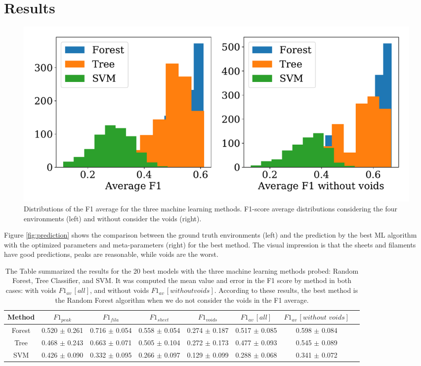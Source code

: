 \documentclass[usenatbib]{mnras}
\begin{document}
\section{Results}\label{sec:results}

\begin{figure}
    \includegraphics[scale=0.46]{Figs/p_hist_f1.pdf}
    \caption{Distributions of the F1 average for the three machine
      learning methods. F1-score average distributions considering the
      four environments (left) and without consider the voids
      (right).} 
    \label{fig:methods}
\end{figure}


Figure \ref{fig:prediction} shows the comparison between the ground
truth environments (left) and the prediction by the best ML algorithm
with the optimized parameters and meta-parameters (right) for the best
method. 
The visual impression is that the sheets and filaments have good predictions,
peaks are reasonable, while voids are the worst. 

\begin{table}
\centering
\begin{tabular}{cccccccc}
\hline
 Method   & $F1_{peak}$     & $F1_{fila}$     & $F1_{sheet}$    & $F1_{voids}$    & $F1_{av}\,[all]$   & $F1_{av}\,[without \,\,voids]$   \\
\hline
 Forest   & 0.520 $\pm$ 0.261  & 0.716 $\pm$ 0.054 & 0.558 $\pm$ 0.054 & 0.274 $\pm$ 0.187 & 0.517 $\pm$ 0.085  & 0.598 $\pm$ 0.084 \\
 Tree     & 0.468 $\pm$ 0.243 & 0.663 $\pm$ 0.071 & 0.505 $\pm$ 0.104 & 0.272 $\pm$ 0.173 & 0.477 $\pm$ 0.093 & 0.545 $\pm$ 0.089  \\
 SVM      & 0.426 $\pm$ 0.090  & 0.332 $\pm$ 0.095 & 0.266 $\pm$ 0.097 & 0.129 $\pm$ 0.099 & 0.288 $\pm$ 0.068 & 0.341 $\pm$ 0.072   \\
\hline
\end{tabular}
\caption{The Table summarized the results for the 20 best models with
  the three machine learning methods probed: Random Forest, Tree
  Classifier, and SVM. It was computed the mean value and error in the
  F1 score by method in both cases: with voids $F1_{av}\,[all]$, and
  without voids $F1_{av}\,[without voids]$. According to these
  results, the best method is the Random Forest algorithm when we do
  not consider the voids in the F1 average.} 
\label{tab:methods}
\end{table}
\end{document}
